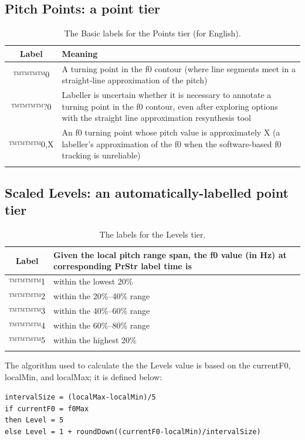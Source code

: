 \documentclass[11pt, twoside]{memoir}
\begin{document}
\subsection*{Pitch Points: a point tier}
\begin{longtable}{cp{.8\linewidth}} \toprule \textbf{Label} & \textbf{Meaning} \tabularnewline
\midrule \endhead
™™™™{0} & A turning point in the f0 contour (where line segments meet in a straight-line approximation of the pitch) \tabularnewline
™™™™{?0} & Labeller is uncertain whether it is necessary to annotate a turning point in the f0 contour, even after exploring options with the straight line approximation resynthesis tool \tabularnewline
™™™™{0,X} & An f0 turning point whose pitch value is approximately X (a labeller’s approximation of the f0 when the software-based f0 tracking is unreliable) \tabularnewline
\bottomrule 
\caption{The Basic labels for the Points tier (for English).%
}
\end{longtable}

\subsection*{Scaled Levels: an automatically-labelled point tier}
\begin{longtable}{cp{.8\linewidth}} \toprule
\textbf{Label} & \textbf{Given the local pitch range span, the f0 value (in Hz) at corresponding PrStr label time is} \tabularnewline
\midrule \endhead
™™™™{1} & within the lowest 20\% \tabularnewline
™™™™{2} & within the 20\%--40\% range \tabularnewline
™™™™{3} & within the 40\%--60\% range \tabularnewline
™™™™{4} & within the 60\%--80\% range \tabularnewline
™™™™{5} & within the highest 20\% \tabularnewline
\bottomrule 
\caption{The labels for the Levels tier.%
}
\end{longtable}

The algorithm used to calculate the the Levels value is based on the currentF0, localMin, and localMax; it is defined below:
\begin{center}
\parbox{.75\linewidth}{
\texttt{intervalSize = (localMax-localMin)/5}\\
\texttt{if currentF0 = f0Max}\\
	\hspace*{1ex}\texttt{then Level = 5}\\
	\hspace*{1ex}\texttt{else Level = 1 + roundDown((currentF0-localMin)/intervalSize)}}
\end{center}
\end{document}
